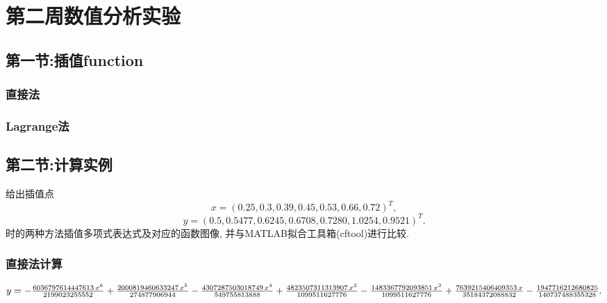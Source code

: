 \section{第二周数值分析实验}
\subsection{第一节:插值function}
\subsubsection{直接法}

\subsubsection{Lagrange法}

\subsection{第二节:计算实例}
\begin{ex}
	给出插值点
	$$x = (0.25, 0.3, 0.39, 0.45, 0.53, 0.66, 0.72)^T,$$  
	$$y = (0.5, 0.5477, 0.6245, 0.6708, 0.7280, 1.0254, 0.9521)^T .$$ 
	时的两种方法插值多项式表达式及对应的函数图像, 并与MATLAB拟合工具箱(cftool)进行比较.
\end{ex}
\subsubsection{直接法计算}

\qa $y=-\frac{6036797614447613\,x^6}{2199023255552}+\frac{2000819460633247\,x^5}{274877906944}-\frac{4307287503018749\,x^4}{549755813888}\\+\frac{4823507311313907\,x^3}{1099511627776}-\frac{1483367792093851\,x^2}{1099511627776}+\frac{7639215406409353\,x}{35184372088832}-\frac{1947716212680825}{140737488355328}.$
